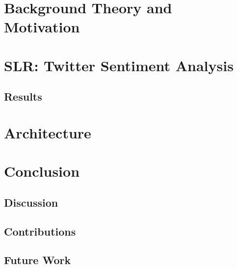 \documentclass[a4paper, 11pt]{book}
\begin{document}
\chapter{Background Theory and Motivation}


\chapter{SLR: Twitter Sentiment Analysis}

\section{Results}


\chapter{Architecture}



\chapter{Conclusion}
\section{Discussion}
\section{Contributions}
\section{Future Work}







\begin{appendices}
  
  
  
\end{appendices}
\end{document}
